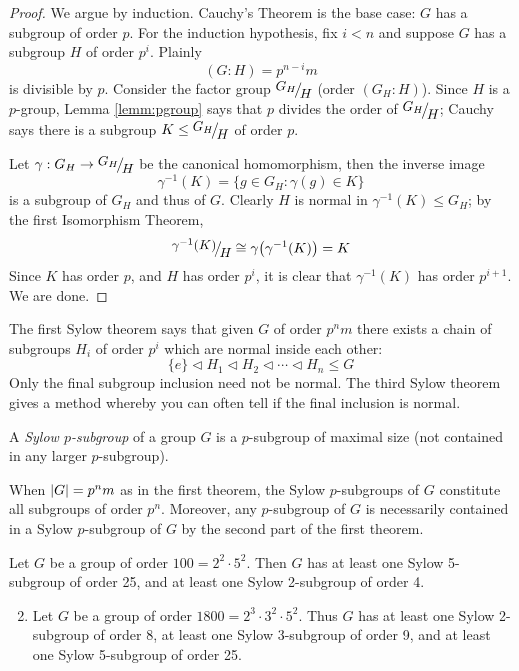 \begin{proof}
	We argue by induction. Cauchy's Theorem is the base case: $G$ has a subgroup of order $p$.\smallbreak
	For the induction hypothesis, fix $i<n$ and suppose $G$ has a subgroup $H$ of order $p^i$. Plainly 
	\[
		(G:H)=p^{n-i}m
	\]
	is divisible by $p$. Consider the factor group $\quotient{G_H}H$ (order $(G_H:H)$). Since $H$ is a $p$-group, Lemma \ref{lemm:pgroup} says that $p$ divides the order of $\quotient{G_H}H$; Cauchy says there is a subgroup $K\le \quotient{G_H}H$ of order $p$.\par
	Let $\gamma:G_H\to\quotient{G_H}H$ be the canonical homomorphism, then the inverse image
	\[
		\gamma^{-1}(K)=\bigl\{g\in G_H:\gamma(g)\in K\bigr\}
	\]
	is a subgroup of $G_H$ and thus of $G$. Clearly $H$ is normal in $\gamma^{-1}(K)\le G_H$; by the first Isomorphism Theorem,
	\[
		\quotient{\gamma^{-1}(K)}H\cong\gamma\bigl(\gamma^{-1}(K)\bigr)=K
	\]
	Since $K$ has order $p$, and $H$ has order $p^i$, it is clear that $\gamma^{-1}(K)$ has order $p^{i+1}$. We are done.
\end{proof}

The first Sylow theorem says that given $G$ of order $p^nm$ there exists a chain of subgroups $H_i$ of order $p^i$ which are normal inside each other:
\[
	\{e\}\triangleleft H_1\triangleleft H_2\triangleleft\cdots\triangleleft H_n\le G
\]
Only the final subgroup inclusion need not be normal. The third Sylow theorem gives a method whereby you can often tell if the final inclusion is normal.

\begin{defn}{}{}
	A \emph{Sylow $p$-subgroup} of a group $G$ is a $p$-subgroup of maximal size (not contained in any larger $p$-subgroup).
\end{defn}

When $\left| G\right|=p^nm$ as in the first theorem, the Sylow $p$-subgroups of $G$ constitute all subgroups of order $p^n$. Moreover, any $p$-subgroup of $G$ is necessarily contained in a Sylow $p$-subgroup of $G$ by the second part of the first theorem.

\begin{examples}{}{}
	\exstart Let $G$ be a group of order $100=2^2\cdot 5^2$. Then $G$ has at least one Sylow 5-subgroup of order 25, and at least one Sylow 2-subgroup of order 4.
	\begin{enumerate}\setcounter{enumi}{1}
		\item Let $G$ be a group of order $1800=2^3\cdot 3^2\cdot 5^2$. Thus $G$ has at least one Sylow 2-subgroup of order 8, at least one Sylow 3-subgroup of order 9, and at least one Sylow 5-subgroup of order 25.
	\end{enumerate}
\end{examples}

